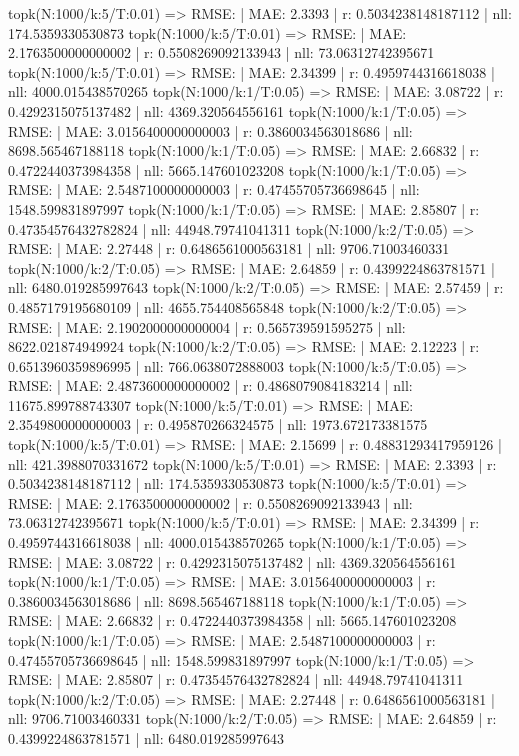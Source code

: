 topk(N:1000/k:5/T:0.01) => RMSE: | MAE: 2.3393 | r: 0.5034238148187112 | nll: 174.5359330530873
topk(N:1000/k:5/T:0.01) => RMSE: | MAE: 2.1763500000000002 | r: 0.5508269092133943 | nll: 73.06312742395671
topk(N:1000/k:5/T:0.01) => RMSE: | MAE: 2.34399 | r: 0.4959744316618038 | nll: 4000.015438570265
topk(N:1000/k:1/T:0.05) => RMSE: | MAE: 3.08722 | r: 0.4292315075137482 | nll: 4369.320564556161
topk(N:1000/k:1/T:0.05) => RMSE: | MAE: 3.0156400000000003 | r: 0.3860034563018686 | nll: 8698.565467188118
topk(N:1000/k:1/T:0.05) => RMSE: | MAE: 2.66832 | r: 0.4722440373984358 | nll: 5665.147601023208
topk(N:1000/k:1/T:0.05) => RMSE: | MAE: 2.5487100000000003 | r: 0.47455705736698645 | nll: 1548.599831897997
topk(N:1000/k:1/T:0.05) => RMSE: | MAE: 2.85807 | r: 0.47354576432782824 | nll: 44948.79741041311
topk(N:1000/k:2/T:0.05) => RMSE: | MAE: 2.27448 | r: 0.6486561000563181 | nll: 9706.71003460331
topk(N:1000/k:2/T:0.05) => RMSE: | MAE: 2.64859 | r: 0.4399224863781571 | nll: 6480.019285997643
topk(N:1000/k:2/T:0.05) => RMSE: | MAE: 2.57459 | r: 0.4857179195680109 | nll: 4655.754408565848
topk(N:1000/k:2/T:0.05) => RMSE: | MAE: 2.1902000000000004 | r: 0.565739591595275 | nll: 8622.021874949924
topk(N:1000/k:2/T:0.05) => RMSE: | MAE: 2.12223 | r: 0.6513960359896995 | nll: 766.0638072888003
topk(N:1000/k:5/T:0.05) => RMSE: | MAE: 2.4873600000000002 | r: 0.4868079084183214 | nll: 11675.899788743307
topk(N:1000/k:5/T:0.01) => RMSE: | MAE: 2.3549800000000003 | r: 0.495870266324575 | nll: 1973.672173381575
topk(N:1000/k:5/T:0.01) => RMSE: | MAE: 2.15699 | r: 0.48831293417959126 | nll: 421.3988070331672
topk(N:1000/k:5/T:0.01) => RMSE: | MAE: 2.3393 | r: 0.5034238148187112 | nll: 174.5359330530873
topk(N:1000/k:5/T:0.01) => RMSE: | MAE: 2.1763500000000002 | r: 0.5508269092133943 | nll: 73.06312742395671
topk(N:1000/k:5/T:0.01) => RMSE: | MAE: 2.34399 | r: 0.4959744316618038 | nll: 4000.015438570265
topk(N:1000/k:1/T:0.05) => RMSE: | MAE: 3.08722 | r: 0.4292315075137482 | nll: 4369.320564556161
topk(N:1000/k:1/T:0.05) => RMSE: | MAE: 3.0156400000000003 | r: 0.3860034563018686 | nll: 8698.565467188118
topk(N:1000/k:1/T:0.05) => RMSE: | MAE: 2.66832 | r: 0.4722440373984358 | nll: 5665.147601023208
topk(N:1000/k:1/T:0.05) => RMSE: | MAE: 2.5487100000000003 | r: 0.47455705736698645 | nll: 1548.599831897997
topk(N:1000/k:1/T:0.05) => RMSE: | MAE: 2.85807 | r: 0.47354576432782824 | nll: 44948.79741041311
topk(N:1000/k:2/T:0.05) => RMSE: | MAE: 2.27448 | r: 0.6486561000563181 | nll: 9706.71003460331
topk(N:1000/k:2/T:0.05) => RMSE: | MAE: 2.64859 | r: 0.4399224863781571 | nll: 6480.019285997643

